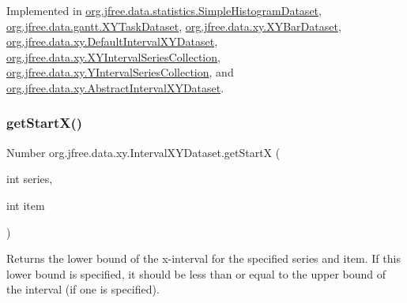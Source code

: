 Implemented in \mbox{\hyperlink{classorg_1_1jfree_1_1data_1_1statistics_1_1_simple_histogram_dataset_af8a27ec1e56f24f0530bc724c58ac2e5}{org.\+jfree.\+data.\+statistics.\+Simple\+Histogram\+Dataset}}, \mbox{\hyperlink{classorg_1_1jfree_1_1data_1_1gantt_1_1_x_y_task_dataset_a8524d9e1fec8959bd9dc9fe78688d5cf}{org.\+jfree.\+data.\+gantt.\+X\+Y\+Task\+Dataset}}, \mbox{\hyperlink{classorg_1_1jfree_1_1data_1_1xy_1_1_x_y_bar_dataset_a0d37cd7bac49afb6555e23d7d1ef1868}{org.\+jfree.\+data.\+xy.\+X\+Y\+Bar\+Dataset}}, \mbox{\hyperlink{classorg_1_1jfree_1_1data_1_1xy_1_1_default_interval_x_y_dataset_a4c259724fd0f58a34c3b0f2ea3825bc5}{org.\+jfree.\+data.\+xy.\+Default\+Interval\+X\+Y\+Dataset}}, \mbox{\hyperlink{classorg_1_1jfree_1_1data_1_1xy_1_1_x_y_interval_series_collection_af64aae33d2436a5f394e0dd3ebbbbb9f}{org.\+jfree.\+data.\+xy.\+X\+Y\+Interval\+Series\+Collection}}, \mbox{\hyperlink{classorg_1_1jfree_1_1data_1_1xy_1_1_y_interval_series_collection_a1a7adfd154a7e2ddf872f4edfeb09dc7}{org.\+jfree.\+data.\+xy.\+Y\+Interval\+Series\+Collection}}, and \mbox{\hyperlink{classorg_1_1jfree_1_1data_1_1xy_1_1_abstract_interval_x_y_dataset_a31d20f77610d2b39a1401a48e06181c1}{org.\+jfree.\+data.\+xy.\+Abstract\+Interval\+X\+Y\+Dataset}}.

\mbox{\label{interfaceorg_1_1jfree_1_1data_1_1xy_1_1_interval_x_y_dataset_a7548ec7d60d72463313dc6f10aceee62}} 
\subsubsection{\texorpdfstring{get\+Start\+X()}{getStartX()}}
{\footnotesize\ttfamily Number org.\+jfree.\+data.\+xy.\+Interval\+X\+Y\+Dataset.\+get\+StartX (\begin{DoxyParamCaption}\item[{int}]{series,  }\item[{int}]{item }\end{DoxyParamCaption})}

Returns the lower bound of the x-\/interval for the specified series and item. If this lower bound is specified, it should be less than or equal to the upper bound of the interval (if one is specified).


